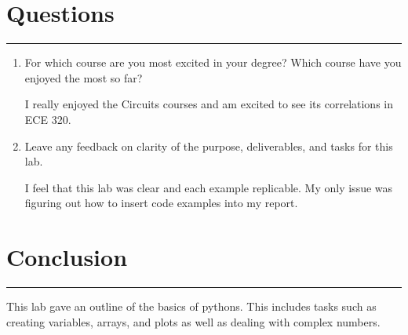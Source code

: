 \documentclass[12pt]{report}
\begin{document}
\section*{Questions}
\hrule
\vspace{1cm}
\setlength{\parindent}{5ex}
\begin{enumerate}
    \item For which course are you most excited in your degree? Which course have you enjoyed the most so far?
    
    \begin{flushleft} I really enjoyed the Circuits courses and am excited to see its correlations in ECE 320.
    \end{flushleft}

    \item Leave any feedback on clarity of the purpose, deliverables, and tasks for this lab.
    
    \begin{flushleft} I feel that this lab was clear and each example replicable. My only issue was figuring out how to insert code examples into my report.
    \end{flushleft}
\end{enumerate}


    




\section*{Conclusion}
\hrule
\vspace{1cm}
\setlength{\parindent}{5ex}
This lab gave an outline of the basics of pythons. This includes tasks such as creating variables, arrays, and plots as well as dealing with complex numbers.\par


\end{document}
